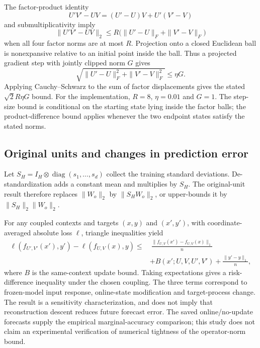 \documentclass[11pt,a4paper]{article}
\begin{document}
The factor-product identity
\begin{equation}
 U'V'-UV=(U'-U)V+U'(V'-V)
\end{equation}
and submultiplicativity imply
\begin{equation}
 \|U'V'-UV\|_2\leq
 R\big(\|U'-U\|_F+\|V'-V\|_F\big)
\end{equation}
when all four factor norms are at most $R$. Projection onto a closed Euclidean ball is nonexpansive relative to an initial point inside the ball. Thus a projected gradient step with jointly clipped norm $G$ gives
\begin{equation}
 \sqrt{\|U'-U\|_F^2+\|V'-V\|_F^2}\leq\eta G.
\end{equation}
Applying Cauchy--Schwarz to the sum of factor displacements gives the stated $\sqrt2R\eta G$ bound. For the implementation, $R=8$, $\eta=0.01$ and $G=1$. The step-size bound is conditional on the starting state lying inside the factor balls; the product-difference bound applies whenever the two endpoint states satisfy the stated norms.

\subsection{Original units and changes in prediction error}
Let $S_H=I_H\otimes\operatorname{diag}(s_1,\ldots,s_d)$ collect the training standard deviations. De-standardization adds a constant mean and multiplies by $S_H$. The original-unit result therefore replaces $\|W_o\|_2$ by $\|S_HW_o\|_2$, or upper-bounds it by $\|S_H\|_2\|W_o\|_2$.

For any coupled contexts and targets $(x,y)$ and $(x',y')$, with coordinate-averaged absolute loss $\ell$, triangle inequalities yield
\begin{align}
\ell(f_{U',V'}(x'),y')-\ell(f_{U,V}(x),y)
\leq&\ \frac{\|f_{U,V}(x')-f_{U,V}(x)\|_1}{n}\\
&+B(x';U,V,U',V')+\frac{\|y'-y\|_1}{n},
\end{align}
where $B$ is the same-context update bound. Taking expectations gives a risk-difference inequality under the chosen coupling. The three terms correspond to frozen-model input response, online-state modification and target-process change. The result is a sensitivity characterization, and does not imply that reconstruction descent reduces future forecast error. The saved online/no-update forecasts supply the empirical marginal-accuracy comparison; this study does not claim an experimental verification of numerical tightness of the operator-norm bound.
\end{document}
